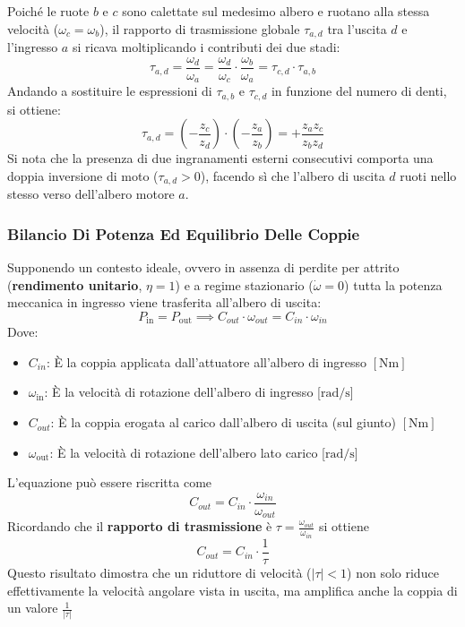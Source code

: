 ﻿\documentclass[11pt, a4paper]{article}
\begin{document}
\vspace{0.3cm}
\noindent
Poiché le ruote $b$ e $c$ sono calettate sul medesimo albero e ruotano alla stessa velocità ($\omega_c = \omega_b$), il rapporto di trasmissione globale $\tau_{a,d}$ tra l'uscita $d$ e l'ingresso $a$ si ricava moltiplicando i contributi dei due stadi:
\[
    \tau_{a,d} = \frac{\omega_d}{\omega_a} = \frac{\omega_d}{\omega_c} \cdot \frac{\omega_b}{\omega_a} = \tau_{c,d} \cdot \tau_{a,b}
\]
Andando a sostituire le espressioni di $\tau_{a,b}$ e $\tau_{c,d}$ in funzione del numero di denti, si ottiene:
\[
    \tau_{a,d} = \left(-\frac{z_c}{z_d}\right) \cdot \left(-\frac{z_a}{z_b}\right) = +\frac{z_a z_c}{z_b z_d}
\]
Si nota che la presenza di due ingranamenti esterni consecutivi comporta una doppia inversione di moto ($\tau_{a,d} > 0$), facendo sì che l'albero di uscita $d$ ruoti nello stesso verso dell'albero motore $a$.
\newpage
\subsubsection{Bilancio Di Potenza Ed Equilibrio Delle Coppie}
Supponendo un contesto ideale, ovvero in assenza di perdite per attrito (\textbf{rendimento unitario}, $\eta = 1$) e a regime stazionario ($\dot{\omega} = 0$) tutta la potenza meccanica in ingresso viene trasferita all'albero di uscita:
\[
    P_{\text{in}} = P_{\text{out}} \implies C_{out} \cdot \omega_{out} = C_{in} \cdot \omega_{in}
\]
Dove:
\begin{itemize}
    \item \textbf{$C_{in}$}: È la coppia applicata dall'attuatore all'albero di ingresso $[\si{\newton\meter}]$
    \item \textbf{$\omega_{\text{in}}$}: È la velocità di rotazione dell'albero di ingresso [$\si{\radian\per\second}$]
    \item \textbf{$C_{out}$}: È la coppia erogata al carico dall'albero di uscita (sul giunto) $[\si{\newton\meter}]$
    \item \textbf{$\omega_{\text{out}}$}: È la velocità di rotazione dell'albero lato carico [$\si{\radian\per\second}$]
\end{itemize}
L'equazione può essere riscritta come
\[
    C_{out} =  C_{in} \cdot \frac{\omega_{in}}{\omega_{out}}
\]
Ricordando che il \textbf{rapporto di trasmissione} è $\tau =  \frac{\omega_{out}}{\omega_{in}}$ si ottiene
\[
    \boxed{C_{out} =  C_{in} \cdot \frac{1}{\tau}}
\]
Questo risultato dimostra che un riduttore di velocità ($|\tau| < 1$) non solo riduce effettivamente la velocità angolare vista in uscita, ma amplifica anche la coppia di un valore $\frac{1}{|\tau|}$
\end{document}
